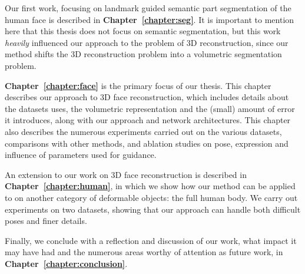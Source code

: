Our first work, focusing on landmark guided semantic part segmentation
of the human face is described in
\textbf{Chapter~\ref{chapter:seg}}. It is important to mention here
that this thesis does not focus on semantic segmentation, but this
work \textit{heavily} influenced our approach to the problem of 3D
reconstruction, since our method shifts the 3D reconstruction problem
into a volumetric segmentation problem.

\textbf{Chapter~\ref{chapter:face}} is the primary focus of our
thesis. This chapter describes our approach to 3D face reconstruction,
which includes details about the datasets uses, the volumetric
representation and the (small) amount of error it introduces, along
with our approach and network architectures. This chapter also
describes the numerous experiments carried out on the various
datasets, comparisons with other methods, and ablation studies on
pose, expression and influence of parameters used for guidance.

An extension to our work on 3D face reconstruction is described in
\textbf{Chapter~\ref{chapter:human}}, in which we show how our method
can be applied to on another category of deformable objects: the full
human body. We carry out experiments on two datasets, showing that our
approach can handle both difficult poses and finer details.

Finally, we conclude with a reflection and discussion of our work,
what impact it may have had and the numerous areas worthy of attention
as future work, in \textbf{Chapter~\ref{chapter:conclusion}}.

